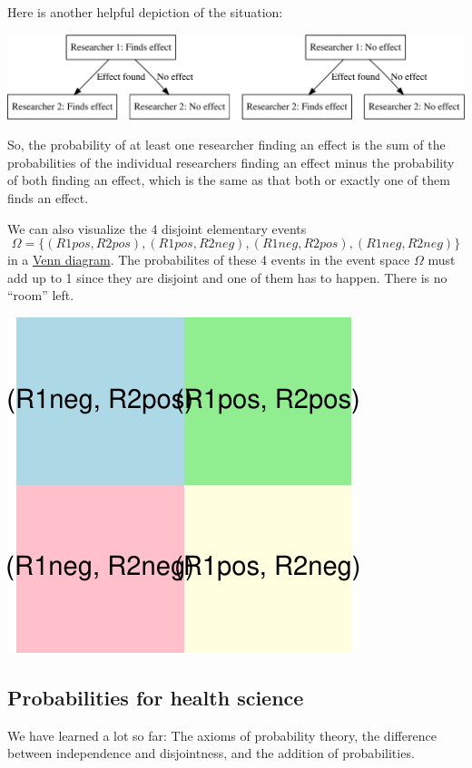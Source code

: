 \documentclass[
]{book}
\newcommand{\pandocbounded}[1]{#1}
\begin{document}
Here is another helpful depiction of the situation:

\pandocbounded{\includegraphics[keepaspectratio]{_main_files/figure-latex/unnamed-chunk-11-1.pdf}}

So, the probability of at least one researcher finding an effect is the sum of the probabilities of the individual researchers finding an effect minus
the probability of both finding an effect, which is the same as that both or exactly one of them finds an effect.

We can also visualize the 4 disjoint elementary events
\[\Omega = \{ (R1pos, R2pos), (R1pos, R2neg), (R1neg, R2pos), (R1neg, R2neg) \}\]
in a \href{https://en.wikipedia.org/wiki/Venn_diagram}{Venn diagram}. The probabilites of these
4 events in the event space \(\Omega\) must add up to 1 since they are disjoint and one of them has to happen. There is no ``room'' left.

\pandocbounded{\includegraphics[keepaspectratio]{_main_files/figure-latex/unnamed-chunk-12-1.pdf}}

\subsection{Probabilities for health science}\label{probabilities_for_health_sciences}

We have learned a lot so far: The axioms of probability theory, the difference between independence and disjointness, and the addition of probabilities.
\end{document}
